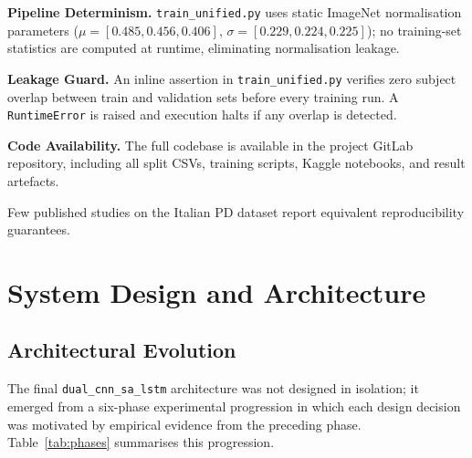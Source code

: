 \documentclass[oneside,openany]{final_report}
\newcommand{\dualcnn}{\texttt{dual\_cnn\_sa\_lstm}}
\begin{document}
\textbf{Pipeline Determinism.} \texttt{train\_unified.py} uses static ImageNet normalisation parameters ($\mu = [0.485, 0.456, 0.406]$, $\sigma = [0.229, 0.224, 0.225]$); no training-set statistics are computed at runtime, eliminating normalisation leakage.

\textbf{Leakage Guard.} An inline assertion in \texttt{train\_unified.py} verifies zero subject overlap between train and validation sets before every training run. A \texttt{RuntimeError} is raised and execution halts if any overlap is detected.

\textbf{Code Availability.} The full codebase is available in the project GitLab repository, including all split CSVs, training scripts, Kaggle notebooks, and result artefacts.

Few published studies on the Italian PD dataset report equivalent reproducibility guarantees.

\chapter{System Design and Architecture}

\section{Architectural Evolution}

The final \dualcnn{} architecture was not designed in isolation; it emerged from a six-phase experimental progression in which each design decision was motivated by empirical evidence from the preceding phase. Table~\ref{tab:phases} summarises this progression.
\end{document}
